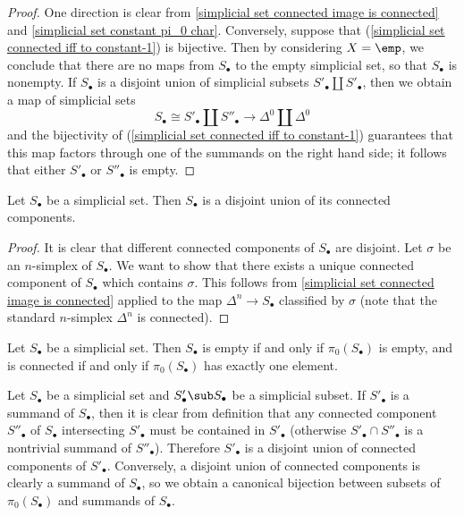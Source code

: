 \begin{proof}
One direction is clear from \cref{simplicial set connected image is connected} and \cref{simplicial set constant pi_0 char}. Conversely, suppose that (\ref{simplicial set connected iff to constant-1}) is bijective. Then by considering $X=\emp$, we conclude that there are no maps from $S_\bullet$ to the empty simplicial set, so that $S_\bullet$ is nonempty. If $S_\bullet$ is a disjoint union of simplicial subsets $S'_\bullet\amalg S'_\bullet$, then we obtain a map of simplicial sets
\[S_\bullet\cong S'_\bullet\amalg S''_\bullet\to\Delta^0\amalg\Delta^0\]
and the bijectivity of (\ref{simplicial set connected iff to constant-1}) guarantees that this map factors through one of the summands on the right hand side; it follows that either $S'_\bullet$ or $S''_\bullet$ is empty.
\end{proof}
\begin{proposition}\label{simplicial set disjoint union of connected component}
Let $S_\bullet$ be a simplicial set. Then $S_\bullet$ is a disjoint union of its connected components.
\end{proposition}
\begin{proof}
It is clear that different connected components of $S_\bullet$ are disjoint. Let $\sigma$ be an $n$-simplex of $S_\bullet$. We want to show that there exists a unique connected component of $S_\bullet$ which contains $\sigma$. This follows from \cref{simplicial set connected image is connected} applied to the map $\Delta^n\to S_\bullet$ classified by $\sigma$ (note that the standard $n$-simplex $\Delta^n$ is connected).
\end{proof}
\begin{corollary}\label{simplicial set connected iff pi_0 singleton}
Let $S_\bullet$ be a simplicial set. Then $S_\bullet$ is empty if and only if $\pi_0(S_\bullet)$ is empty, and is connected if and only if $\pi_0(S_\bullet)$ has exactly one element.
\end{corollary}
\begin{remark}
Let $S_\bullet$ be a simplicial set and $S'_\bullet\sub S_\bullet$ be a simplicial subset. If $S'_\bullet$ is a summand of $S_\bullet$, then it is clear from definition that any connected component $S''_\bullet$ of $S_\bullet$ intersecting $S'_\bullet$ must be contained in $S'_\bullet$ (otherwise $S'_\bullet\cap S''_\bullet$ is a nontrivial summand of $S''_\bullet$). Therefore $S'_\bullet$ is a disjoint union of connected components of $S'_\bullet$. Conversely, a disjoint union of connected components is clearly a summand of $S_\bullet$, so we obtain a canonical bijection between subsets of $\pi_0(S_\bullet)$ and summands of $S_\bullet$.
\end{remark}
